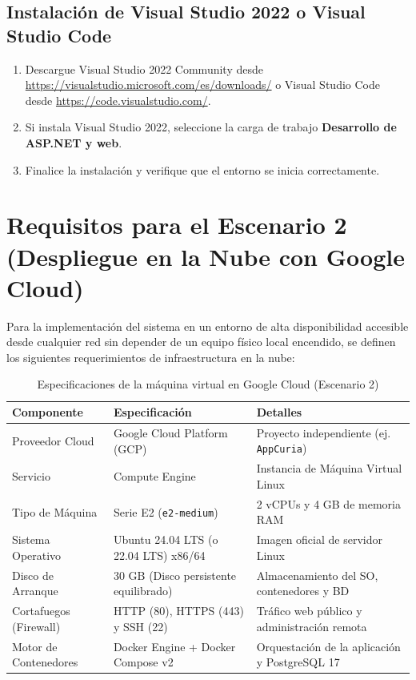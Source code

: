 \subsection{Instalación de Visual Studio 2022 o Visual Studio Code}
\begin{enumerate}
    \item Descargue Visual Studio 2022 Community desde \url{https://visualstudio.microsoft.com/es/downloads/} o Visual Studio Code desde \url{https://code.visualstudio.com/}.
    \item Si instala Visual Studio 2022, seleccione la carga de trabajo \textbf{Desarrollo de ASP.NET y web}.
    \item Finalice la instalación y verifique que el entorno se inicia correctamente.
\end{enumerate}

\section{Requisitos para el Escenario 2 (Despliegue en la Nube con Google Cloud)}\label{sec:req-cloud}
Para la implementación del sistema en un entorno de alta disponibilidad accesible desde cualquier red sin depender de un equipo físico local encendido, se definen los siguientes requerimientos de infraestructura en la nube:

\begin{table}[h]
    \centering
    \begin{tabular}{|l|l|p{6.5cm}|}
        \hline
        \textbf{Componente} & \textbf{Especificación} & \textbf{Detalles} \\ \hline
        Proveedor Cloud & Google Cloud Platform (GCP) & Proyecto independiente (ej. \texttt{AppCuria}) \\ \hline
        Servicio & Compute Engine & Instancia de Máquina Virtual Linux \\ \hline
        Tipo de Máquina & Serie E2 (\texttt{e2-medium}) & 2 vCPUs y 4 GB de memoria RAM \\ \hline
        Sistema Operativo & Ubuntu 24.04 LTS (o 22.04 LTS) x86/64 & Imagen oficial de servidor Linux \\ \hline
        Disco de Arranque & 30 GB (Disco persistente equilibrado) & Almacenamiento del SO, contenedores y BD \\ \hline
        Cortafuegos (Firewall) & HTTP (80), HTTPS (443) y SSH (22) & Tráfico web público y administración remota \\ \hline
        Motor de Contenedores & Docker Engine + Docker Compose v2 & Orquestación de la aplicación y PostgreSQL 17 \\ \hline
    \end{tabular}
    \caption{Especificaciones de la máquina virtual en Google Cloud (Escenario 2)}
\end{table}

